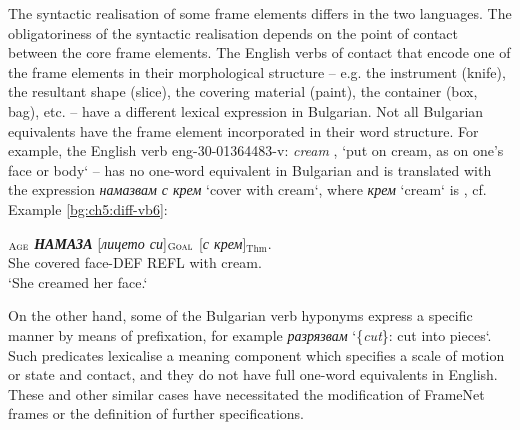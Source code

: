 \documentclass[output=paper,colorlinks,citecolor=brown]{langscibook}
\begin{document}
The syntactic realisation of some frame elements differs in the two languages. The obligatoriness of the syntactic realisation depends on the point of contact between the core frame elements. The English verbs of contact that encode one of the frame elements in their morphological structure – e.g. the instrument (knife), the resultant shape (slice), the covering material (paint), the container (box, bag), etc. – have a different lexical expression in Bulgarian. Not all Bulgarian equivalents have the frame element incorporated in their word structure. For example, the English verb eng-30-01364483-v: \textit{cream} , ‘put on cream, as on one’s face or body` – has no one-word equivalent in Bulgarian and is translated with the expression \textit{намазвам с крем} `cover with cream`, where \textit{крем} `cream` is , cf. Example \ref{bg:ch5:diff-vb6}: 
\begin{exe} 
\ex \label{bg:ch5:diff-vb6}
\gll 
 [{\textit{Тя}}]$_{\text{\textsc{Age}}}$ \textit{\textbf{НАМАЗА}} [\textit{лицето си}]$_{\text{\textsc{Goal}}}$ [\textit{с крем}]$_{\text{Thm}}$.
\\ 
 She covered {face-DEF REFL} {with cream}.\\ 
\glt `She creamed her face.`  
\end{exe}

On the other hand, some of the Bulgarian verb hyponyms express a specific manner by means of prefixation, for example \textit{разрязвам} ‘\{\textit{cut}\}: cut into pieces`. Such predicates lexicalise a meaning component which specifies a scale of motion or state and contact, and they do not have full one-word equivalents in English. These and other similar cases have necessitated the modification of FrameNet frames or the definition of further specifications. 
\end{document}
